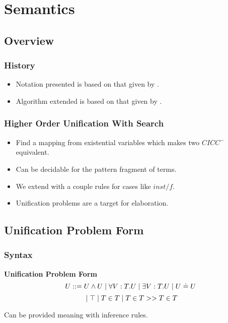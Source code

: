\section{Semantics}

\subsection{Overview}

\begin{frame}
\frametitle{History}
\begin{itemize}
\item Notation presented is based on that given by \citet{pfenning1991logic}.
\item Algorithm extended is based on that given by \citep{pfenning1991unification}.
\end{itemize}
\end{frame}



\begin{frame}
\frametitle{Higher Order Unification With Search}
\begin{itemize}
\item Find a mapping from existential variables which makes two $CICC^-$ equivalent.
\item Can be decidable for the pattern fragment of terms.
\item We extend with a couple rules for cases like $inst/f$.
\item Unification problems are a target for elaboration.
\end{itemize}
\end{frame}



\subsection[$UPF$]{Unification Problem Form}

\begin{frame}
\frametitle{Syntax}
\begin{definition}
\textbf{Unification Problem Form}
\[
U ::= U \wedge U 
 \; | \; \forall V : T . U
 \; | \; \exists V : T . U 
 \; | \; U \doteq U
\]\[
 \; | \; \top
  \; | \; T \in T 
  \; | \; T \in T >> T \in T
\]

\end{definition}

Can be provided meaning with inference rules.

\end{frame}



